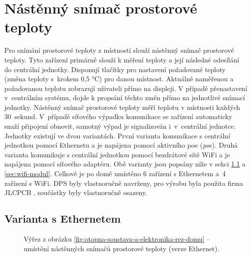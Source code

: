\section{Nástěnný snímač prostorové teploty}

Pro snímání prostorové teploty z místností slouží nástěnný snímač prostorové teploty. Tyto zařízení primárně slouží k měření teploty a její následné odesílání do centrální jednotky. Disponují tlačítky pro nastavení požadované teploty (změna teploty s~krokem 0,5 °C) pro danou místnost. Aktuálně naměřenou a požadovanou teplotu zobrazují uživateli přímo na displeji. V případě přenastavení v~centrálním systému, dojde k propsání těchto změn přímo na jednotlivé snímací jednotky.  Nástěnný snímač prostorové teploty měří teplotu v místnosti každých 30~sekund. V~případě síťového výpadku komunikace se zařízení automaticky snaží připojení obnovit, samotný výpad je signalizován i~v~centrální jednotce. Jednotky existují ve dvou variantách. První varianta komunikace s centrální jednotkou pomocí Ethernetu a je napájena pomocí aktivního \acrshort{poe} (\textit{\acrlong{poe}}). Druhá varianta komunikuje s centrální jednotkou pomocí bezdrátové sítě WiFi a je napájena pomocí síťového adaptéru. Obě varianty jsou popsány níže v sekci \ref{sec:ethernet-modul} a \ref{sec:wifi-modul}. Celkově je po domě umístěno 6 zařízení s Ethernetem a~4 zařízení s WiFi. DPS byly vlastnoručně navrženy, pro výrobu byla použita firma JLCPCB \cite{jlcpcb}, součástky byly vlastnoručně osazeny.

\subsection{Varianta s Ethernetem}
\label{sec:ethernet-modul}

\begin{figure}[H]
   \centering
   \def\svgwidth{0.5\columnwidth}
   
    \caption[Výřez pro umístění nástěnných snímačů prostorové teploty (verze Ethernet).]{Výřez z obrázku \ref{fig:otopna-soustava-a-elektronika-rez-domu} – umístění nástěnných snímačů prostorové teploty (verze Ethernet).}
    \label{fig:vyrez-nastenny-snimac-prostorove-teploty-ethernet}
\end{figure}

